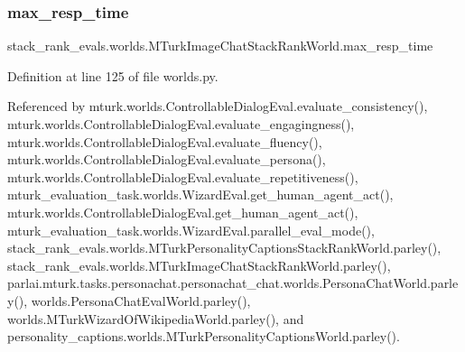 \mbox{\label{classstack__rank__evals_1_1worlds_1_1MTurkImageChatStackRankWorld_aa09f0bf20398cab63189d7aa43029cf5}} 
\subsubsection{\texorpdfstring{max\+\_\+resp\+\_\+time}{max\_resp\_time}}
{\footnotesize\ttfamily stack\+\_\+rank\+\_\+evals.\+worlds.\+M\+Turk\+Image\+Chat\+Stack\+Rank\+World.\+max\+\_\+resp\+\_\+time}



Definition at line 125 of file worlds.\+py.



Referenced by mturk.\+worlds.\+Controllable\+Dialog\+Eval.\+evaluate\+\_\+consistency(), mturk.\+worlds.\+Controllable\+Dialog\+Eval.\+evaluate\+\_\+engagingness(), mturk.\+worlds.\+Controllable\+Dialog\+Eval.\+evaluate\+\_\+fluency(), mturk.\+worlds.\+Controllable\+Dialog\+Eval.\+evaluate\+\_\+persona(), mturk.\+worlds.\+Controllable\+Dialog\+Eval.\+evaluate\+\_\+repetitiveness(), mturk\+\_\+evaluation\+\_\+task.\+worlds.\+Wizard\+Eval.\+get\+\_\+human\+\_\+agent\+\_\+act(), mturk.\+worlds.\+Controllable\+Dialog\+Eval.\+get\+\_\+human\+\_\+agent\+\_\+act(), mturk\+\_\+evaluation\+\_\+task.\+worlds.\+Wizard\+Eval.\+parallel\+\_\+eval\+\_\+mode(), stack\+\_\+rank\+\_\+evals.\+worlds.\+M\+Turk\+Personality\+Captions\+Stack\+Rank\+World.\+parley(), stack\+\_\+rank\+\_\+evals.\+worlds.\+M\+Turk\+Image\+Chat\+Stack\+Rank\+World.\+parley(), parlai.\+mturk.\+tasks.\+personachat.\+personachat\+\_\+chat.\+worlds.\+Persona\+Chat\+World.\+parley(), worlds.\+Persona\+Chat\+Eval\+World.\+parley(), worlds.\+M\+Turk\+Wizard\+Of\+Wikipedia\+World.\+parley(), and personality\+\_\+captions.\+worlds.\+M\+Turk\+Personality\+Captions\+World.\+parley().

\mbox{\label{classstack__rank__evals_1_1worlds_1_1MTurkImageChatStackRankWorld_adf12dbf04b7c2ef32ea7e7c8baacb90d}} 
